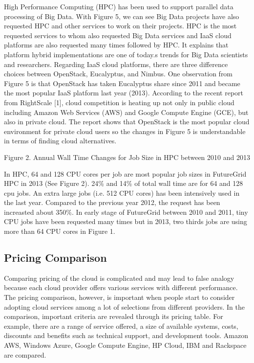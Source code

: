 \documentclass{sig-alternate}
\begin{document}
High Performance Computing (HPC) has been used to support parallel data processing of Big Data. With Figure 5, we can see Big Data projects have also requested HPC and other services to work on their projects. HPC is the most requested services to whom also requested Big Data services and IaaS cloud platforms are also requested many times followed by HPC. It explains that platform hybrid implementations are one of today.s trends for Big Data scientists and researchers. Regarding IaaS cloud platforms, there are three difference choices between OpenStack, Eucalyptus, and Nimbus. One observation from Figure 5 is that OpenStack has taken Eucalyptus share since 2011 and became the most popular IaaS platform last year (2013). According to the recent report from RightScale [1], cloud competition is heating up not only in public cloud including Amazon Web Services (AWS) and Google Compute Engine (GCE), but also in private cloud. The report shows that OpenStack is the most popular cloud environment for private cloud users so the changes in Figure 5 is understandable in terms of finding cloud alternatives.

Figure 2. Annual Wall Time Changes for Job Size in HPC between 2010 and 2013

In HPC, 64 and 128 CPU cores per job are most popular job sizes in FutureGrid HPC in 2013 (See Figure 2). 24\% and 14\% of total wall time are for 64 and 128 cpu jobs. An extra large jobs (i.e. 512 CPU cores) has been intensively used in the last year. Compared to the previous year 2012, the request has been increasted about 350\%. In early stage of FutureGrid between 2010 and 2011, tiny CPU jobs have been requested many times but in 2013, two thirds jobs are using more than 64 CPU cores in Figure 1.
 
\subsection{Pricing Comparison}

Comparing pricing of the cloud is complicated and may lead to false analogy because each cloud provider offers various services with different performance. The pricing comparison, however, is important when people start to consider adopting cloud services among a lot of selections from different providers. In the comparison, important criteria are revealed through its pricing table. For example, there are a range of service offered, a size of available systems, costs, discounts and benefits such as technical support, and development tools. Amazon AWS, Windows Azure, Google Compute Engine, HP Cloud, IBM and Rackspace are compared.
\end{document}
